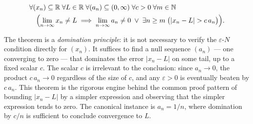 \begin{remark*}
\[
\begin{aligned}
&\forall (x_n) \subseteq \mathbb{R} \;\forall L \in \mathbb{R}
 \;\forall (a_n) \subseteq (0,\infty) \;\forall c > 0
 \;\forall m \in \mathbb{N}\\
&\quad\Bigl(
    \lim_{n \to \infty} x_n \neq L
    \;\Longrightarrow\;
    \lim_{n \to \infty} a_n \neq 0
    \;\lor\;
    \exists n \ge m \;\bigl(|x_n - L| > c\, a_n\bigr)
\Bigr).
\end{aligned}
\]
\end{remark*}

\begin{remark*}[Interpretation]
The theorem is a \emph{domination principle}: it is not necessary to
verify the $\varepsilon$-$N$ condition directly for $(x_n)$. It
suffices to find a null sequence $(a_n)$ — one converging to zero —
that dominates the error $|x_n - L|$ on some tail, up to a fixed
scalar $c$. The scalar $c$ is irrelevant to the conclusion: since
$a_n \to 0$, the product $c\, a_n \to 0$ regardless of the size of
$c$, and any $\varepsilon > 0$ is eventually beaten by $c\, a_n$.
This theorem is the rigorous engine behind the common proof pattern
of bounding $|x_n - L|$ by a simpler expression and observing that
the simpler expression tends to zero. The canonical instance is
$a_n = 1/n$, where domination by $c/n$ is sufficient to conclude
convergence to $L$.
\end{remark*}

































